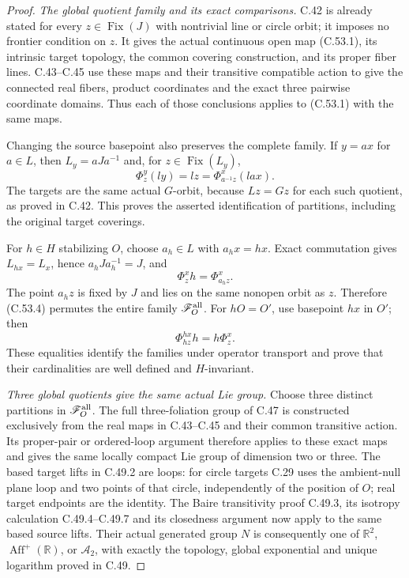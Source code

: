 \begin{proof}
\emph{The global quotient family and its exact comparisons.}
C.42 is already stated for every $z\in\operatorname{Fix}(J)$
with nontrivial line or circle orbit; it imposes no
frontier condition on $z$. It gives the actual continuous
open map (C.53.1), its intrinsic target topology, the
common covering construction, and its proper fiber lines.
C.43--C.45 use these maps and their transitive compatible
action to give the connected real fibers, product
coordinates and the exact three pairwise coordinate
domains. Thus each of those conclusions applies to
(C.53.1) with the same maps.

Changing the source basepoint also preserves the complete
family. If $y=ax$ for $a\in L$, then
$L_y=aJa^{-1}$ and, for $z\in\operatorname{Fix}(L_y)$,
\[
                \Phi_z^y(ly)=lz
                     =\Phi_{a^{-1}z}^x(lax).
                                                        \tag{C.53.3}
\]
The targets are the same actual $G$-orbit, because
$Lz=Gz$ for each such quotient, as proved in C.42.
This proves the asserted identification of partitions,
including the original target coverings.

For $h\in H$ stabilizing $O$, choose $a_h\in L$ with
$a_hx=hx$. Exact commutation gives
$L_{hx}=L_x$, hence $a_hJa_h^{-1}=J$, and
\[
                   \Phi_z^x h=\Phi_{a_hz}^x.             \tag{C.53.4}
\]
The point $a_hz$ is fixed by $J$ and lies on the same
nonopen orbit as $z$. Therefore (C.53.4) permutes the
entire family $\mathscr F_O^{\rm all}$. For $hO=O'$, use
basepoint $hx$ in $O'$; then
\[
               \Phi_{hz}^{hx}h=h\Phi_z^x.              \tag{C.53.5}
\]
These equalities identify the families under operator
transport and prove that their cardinalities are
well defined and $H$-invariant.

\emph{Three global quotients give the same actual Lie group.}
Choose three distinct partitions in
$\mathscr F_O^{\rm all}$. The full three-foliation group
of C.47 is constructed exclusively from the real maps
in C.43--C.45 and their common transitive action.
Its proper-pair or ordered-loop argument therefore
applies to these exact maps and gives the same locally
compact Lie group of dimension two or three.
The based target lifts in C.49.2 are loops: for circle
targets C.29 uses the ambient-null plane loop and two
points of that circle, independently of the position
of $O$; real target endpoints are the identity.
The Baire transitivity proof C.49.3, its isotropy
calculation C.49.4--C.49.7 and its closedness argument
now apply to the same based source lifts. Their actual
generated group $N$ is consequently one of
$\mathbb R^2$, $\operatorname{Aff}^+(\mathbb R)$, or
$\mathcal A_2$, with exactly the topology, global
exponential and unique logarithm proved in C.49.


\end{proof}
